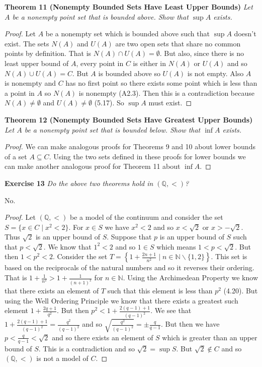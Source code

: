 \documentclass{article}
\begin{document}
\begin{flushleft}
\textbf{Theorem 11 (Nonempty Bounded Sets Have Least Upper Bounds)}
\textsl{Let $A$ be a nonempty point set that is bounded above. Show that $\sup A$ exists.}
\begin{proof}
Let $A$ be a nonempty set which is bounded above such that $\sup A$ doesn't exist. The sets $N(A)$ and $U(A)$ are two open sets that share no common points by definition. That is $N(A) \cap U(A) = \emptyset$. But also, since there is no least upper bound of $A$, every point in $C$ is either in $N(A)$ or $U(A)$ and so $N(A) \cup U(A) = C$. But $A$ is bounded above so $U(A)$ is not empty. Also $A$ is nonempty and $C$ has no first point so there exists some point which is less than a point in $A$ so $N(A)$ is nonempty (A2.3). Then this is a contradiction because $N(A) \neq \emptyset$ and $U(A) \neq \emptyset$ (5.17). So $\sup A$ must exist.
\end{proof}

\textbf{Theorem 12 (Nonempty Bounded Sets Have Greatest Upper Bounds)}
\textsl{Let $A$ be a nonempty point set that is bounded below. Show that $\inf A$ exists.}
\begin{proof}
We can make analogous proofs for Theorems 9 and 10 about lower bounds of a set $A \subseteq C$. Using the two sets defined in these proofs for lower bounds we can make another analogous proof for Theorem 11 about $\inf A$.
\end{proof}

\textbf{Exercise 13}
\textsl{Do the above two theorems hold in $(\mathbb{Q},<)$?}\newline

No.
\begin{proof}
Let $(\mathbb{Q},<)$ be a model of the continuum and consider the set $S=\{x \in C \mid x^2 < 2\}$. For $x \in S$ we have $x^2 < 2$ and so $x < \sqrt{2}$ or $x > -\sqrt{2}$. Thus $\sqrt{2}$ is an upper bound of $S$. Suppose that $p$ is an upper bound of $S$ such that $p<\sqrt{2}$. We know that $1^2<2$ and so $1 \in S$ which means $1<p<\sqrt{2}$. But then $1<p^2<2$. Consider the set $T=\left\{1+\frac{2n+1}{n^2} \mid n \in \mathbb{N} \backslash \{1,2\} \right\}$. This set is based on the reciprocals of the natural numbers and so it reverses their ordering. That is $1+\frac{1}{n^2} > 1+ \frac{1}{(n+1)^2}$ for $n \in \mathbb{N}$. Using the Archimedean Property we know that there exists an element of $T$ such that this element is less than $p^2$ (4.20). But using the Well Ordering Principle we know that there exists a greatest such element $1+\frac{2q+1}{q^2}$. But then $p^2 < 1+\frac{2(q-1) +1}{(q-1)^2}$. We see that $1+\frac{2(q-1) +1}{(q-1)^2} = \frac{q^2}{(q-1)^2}$ and so $\sqrt{\frac{q^2}{(q-1)^2}}=\pm \frac{q}{q-1}$. But then we have $p<\frac{q}{q-1}<\sqrt{2}$ and so there exists an element of $S$ which is greater than an upper bound of $S$. This is a contradiction and so $\sqrt{2} = \sup S$. But $\sqrt{2} \notin C$ and so $(\mathbb{Q},<)$ is not a model of $C$.
\end{proof}
\newpage


\end{flushleft}
\end{document}
